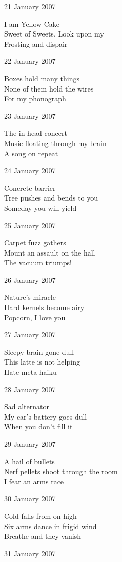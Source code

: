 \documentclass[12pt]{article}
\begin{document}
21 January 2007

I am Yellow Cake \\
Sweet of Sweets. Look upon my \\
Frosting and dispair 

22 January 2007

Boxes hold many things \\
None of them hold the wires \\
For my phonograph

23 January 2007

The in-head concert \\
Music floating through my brain \\
A song on repeat

24 January 2007

Concrete barrier \\
Tree pushes and bends to you \\
Someday you will yield 

25 January 2007

Carpet fuzz gathers \\
Mount an assault on the hall \\
The vacuum triumps!


\newpage

26 January 2007

Nature's miracle \\
Hard kernels become airy \\
Popcorn, I love you

27 January 2007

Sleepy brain gone dull \\
This latte is not helping \\
Hate meta haiku

28 January 2007

Sad alternator \\
My car's battery goes dull \\
When you don't fill it

29 January 2007

A hail of bullets \\
Nerf pellets shoot through the room \\
I fear an arms race

30 January 2007

Cold falls from on high \\
Six arms dance in frigid wind \\
Breathe and they vanish

31 January 2007
\end{document}
